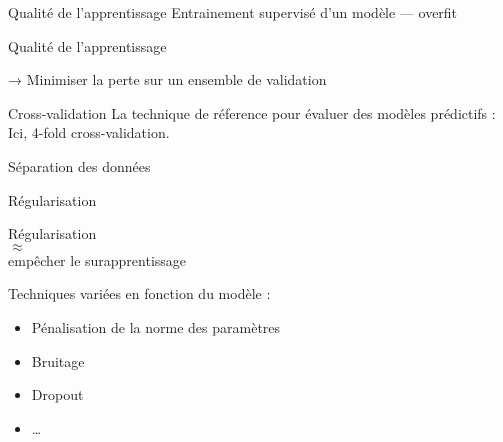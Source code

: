 \begin{frame}{Qualité de l'apprentissage}
  Entrainement supervisé d'un modèle — overfit


\end{frame}

\begin{frame}{Qualité de l'apprentissage}


  → Minimiser la perte sur un ensemble de validation
\end{frame}

\begin{frame}{Cross-validation}
  La technique de réference pour évaluer des modèles prédictifs :
  Ici, 4-fold cross-validation.
\end{frame}

\begin{frame}{Séparation des données}
\end{frame}

\begin{frame}{Régularisation}
  \begin{minipage}[l]{0.49\linewidth}
    \begin{center}
      Régularisation \\
      $\approx$\\
      empêcher le surapprentissage
    \end{center}
  \end{minipage}\hfill
  \begin{minipage}[l]{0.49\linewidth}
  \end{minipage}\hfill
  Techniques variées en fonction du modèle :
  \begin{itemize}
  \item Pénalisation de la norme des paramètres
  \item Bruitage
  \item Dropout
  \item …
  \end{itemize}
\end{frame}

